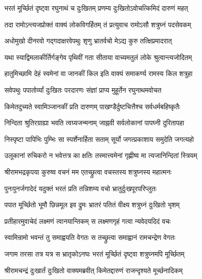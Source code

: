 \twolineshloka
{भरतं मूर्च्छितं दृष्ट्वा रघुनाथं च दुःखितम्}
{प्रणम्य दुःखितोऽवोचत्किमिदं दारुणं महत्}%

\twolineshloka
{तदा रामोऽन्त्यजप्रोक्तं वाक्यं लोकविगर्हितम्}
{तं प्रत्युवाच रामोऽसौ शत्रुघ्नं पदसेवकम्}%

\twolineshloka
{अधोमुखो दीनरवो गद्गदाक्षरवेपथुः}
{शृणु भ्रातर्वचो मेऽद्य कुरु तत्क्षिप्रमादरात्}%

\twolineshloka
{यथा स्याद्विमलाकीर्तिर्गङ्गेव पृथिवीं गता}
{सीताया वाच्यमतुलं लोके श्रुत्वान्त्यजोदितम्}%

\twolineshloka
{हातुमिच्छामि देहं स्वमेनां वा जानकीं किल}
{इति वाक्यं समाकर्ण्य रामस्य किल शत्रुहा}%

\twolineshloka
{सवेपथुः पपातोर्व्यां दुःखितः परदारणः}
{संज्ञां प्राप्य मुहूर्तेन रघुनाथमवोचत}%


\twolineshloka
{किमेतदुच्यते स्वामिञ्जानकीं प्रति दारुणम्}
{पाखण्डैर्दुष्टचित्तैश्च सर्वधर्मबहिष्कृतैः}%

\twolineshloka
{निन्दिता श्रुतिरग्राह्या भवति त्वग्र्यजन्मनाम्}
{जाह्नवी सर्वलोकानां पापघ्नी दुरितापहा}%

\twolineshloka
{निस्पृष्टा पापिभिः पुम्भिः सा स्पर्शेनार्हिता सताम्}
{सूर्यो जगत्प्रकाशाय समुदेति जगत्यहो}%

\twolineshloka
{उलूकानां रुचिकरो न भवेत्तत्र का क्षतिः}
{तस्मात्त्वमेनां गृह्णीष्व मा त्यजानिन्दितां स्त्रियम्}%

\twolineshloka
{श्रीरामभद्रकृपया कुरुष्व वचनं मम}
{एतच्छ्रुत्वा वचस्तस्य शत्रुघ्नस्य महात्मनः}%

\twolineshloka
{पुनःपुनर्जगादेदं यदुक्तं भरतं प्रति}
{तन्निशम्य वचो भ्रातुर्दुःखपूरपरिप्लुतः}%

\twolineshloka
{पपात मूर्च्छितो भूमौ छिन्नमूल इव द्रुमः}
{भ्रातरं पतितं वीक्ष्य शत्रुघ्नं दुःखितो भृशम्}%

\twolineshloka
{प्रतीहारमुवाचेदं लक्ष्मणं त्वानयान्तिकम्}
{स लक्ष्मणगृहं गत्वा न्यवेदयदिदं वचः}%


\twolineshloka
{स्वामिन्रामो भवन्तं तु समाह्वयति वेगतः}
{स तच्छ्रुत्वा समाह्वानं रामचन्द्रेण वेगतः}%

\twolineshloka
{जगाम तरसा तत्र यत्र स भ्रातृकोऽनघः}
{भरतं मूर्च्छितं दृष्ट्वा शत्रुघ्नमपि मूर्च्छितम्}%

\twolineshloka
{श्रीरामचन्द्रं दुःखार्तं दुःखितो वाक्यमब्रवीत्}
{किमेतद्दारुणं राजन्दृश्यते मूर्च्छनादिकम्}%

